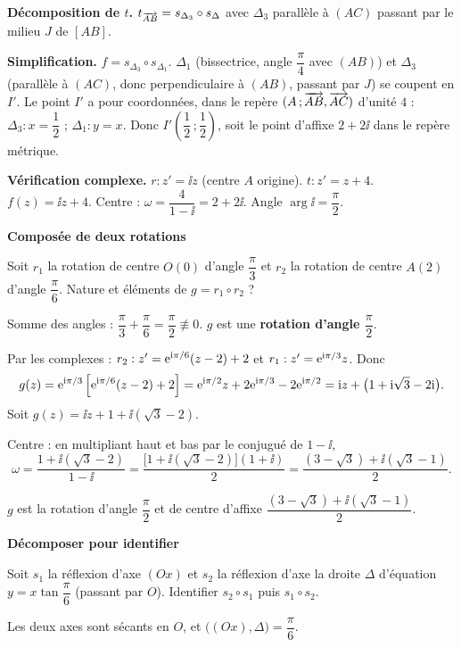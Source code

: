 \textbf{Décomposition de $t$.} $t_{\overrightarrow{AB}}=s_{\Delta_3}\circ s_{\Delta}$
avec $\Delta_3$ parallèle à $(AC)$ passant par le milieu $J$ de $[AB]$.

\textbf{Simplification.} $f=s_{\Delta_3}\circ s_{\Delta_1}$.
$\Delta_1$ (bissectrice, angle $\dfrac{\pi}{4}$ avec $(AB)$) et $\Delta_3$
(parallèle à $(AC)$, donc perpendiculaire à $(AB)$, passant par $J$) se
coupent en $I'$. Le point $I'$ a pour coordonnées, dans le repère
$(A\,;\overrightarrow{AB},\overrightarrow{AC})$ d'unité $4$ : $\Delta_3 : x=\dfrac12$ ;
$\Delta_1 : y=x$. Donc $I'\left(\dfrac12\,;\dfrac12\right)$, soit le point
d'affixe $2+2\ii$ dans le repère métrique.

\textbf{Vérification complexe.} $r : z'=\ii z$ (centre $A$ origine).
$t : z'=z+4$. $f(z)=\ii z + 4$. Centre : $\omega=\dfrac{4}{1-\ii}=2+2\ii$.
Angle $\arg\ii=\dfrac{\pi}{2}$. \checkmark

\exerciceresolu
\textbf{Composée de deux rotations}

Soit $r_1$ la rotation de centre $O(0)$ d'angle $\dfrac{\pi}{3}$ et $r_2$
la rotation de centre $A(2)$ d'angle $\dfrac{\pi}{6}$.
Nature et éléments de $g=r_1\circ r_2$ ?

\solution

Somme des angles : $\dfrac{\pi}{3}+\dfrac{\pi}{6}=\dfrac{\pi}{2}\not\equiv 0$.
$g$ est une \textbf{rotation d'angle $\dfrac{\pi}{2}$}.

Par les complexes : $r_2 : z' = \mathrm{e}^{\mathrm{i}\pi/6}(z-2)+2$ et
$r_1 : z'=\mathrm{e}^{\mathrm{i}\pi/3}z$. Donc
$$
g(z) = \mathrm{e}^{\mathrm{i}\pi/3}\left[\mathrm{e}^{\mathrm{i}\pi/6}(z-2)+2\right]
= \mathrm{e}^{\mathrm{i}\pi/2}z + 2\mathrm{e}^{\mathrm{i}\pi/3} - 2\mathrm{e}^{\mathrm{i}\pi/2}
= \mathrm{i} z + \bigl(1 + \mathrm{i}\sqrt 3 - 2\mathrm{i}\bigr).
$$
Soit $g(z) = \ii z + 1 + \ii(\sqrt 3 - 2)$.

Centre : en multipliant haut et bas par le conjugué de $1-\ii$,
$$
\omega = \frac{1 + \ii(\sqrt 3 - 2)}{1 - \ii}
= \frac{\bigl[1+\ii(\sqrt3-2)\bigr](1+\ii)}{2}
= \frac{(3-\sqrt3) + \ii(\sqrt3 - 1)}{2}.
$$

$g$ est la rotation d'angle $\dfrac{\pi}{2}$ et de centre d'affixe
$\dfrac{(3-\sqrt3)+\ii(\sqrt3-1)}{2}$.

\exerciceresolu
\textbf{Décomposer pour identifier}

Soit $s_1$ la réflexion d'axe $(Ox)$ et $s_2$ la réflexion d'axe la droite
$\Delta$ d'équation $y = x\tan\dfrac{\pi}{6}$ (passant par $O$).
Identifier $s_2\circ s_1$ puis $s_1\circ s_2$.

\solution

Les deux axes sont sécants en $O$, et $\bigl((Ox),\Delta\bigr)=\dfrac{\pi}{6}$.

